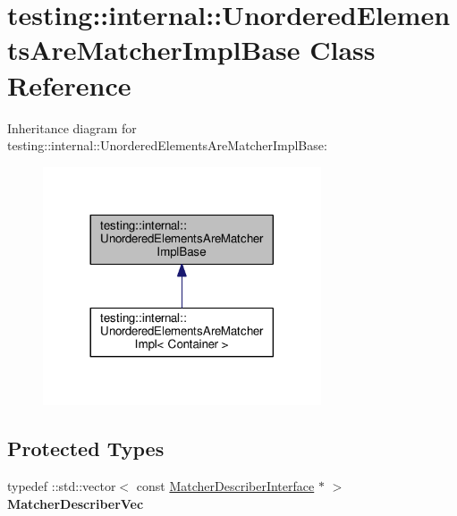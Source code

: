 \hypertarget{classtesting_1_1internal_1_1_unordered_elements_are_matcher_impl_base}{}\section{testing\+:\+:internal\+:\+:Unordered\+Elements\+Are\+Matcher\+Impl\+Base Class Reference}
\label{classtesting_1_1internal_1_1_unordered_elements_are_matcher_impl_base}


Inheritance diagram for testing\+:\+:internal\+:\+:Unordered\+Elements\+Are\+Matcher\+Impl\+Base\+:
\nopagebreak
\begin{figure}[H]
\begin{center}
\leavevmode
\includegraphics[width=233pt]{classtesting_1_1internal_1_1_unordered_elements_are_matcher_impl_base__inherit__graph}
\end{center}
\end{figure}
\subsection*{Protected Types}
\begin{DoxyCompactItemize}
\item 
\mbox{\label{classtesting_1_1internal_1_1_unordered_elements_are_matcher_impl_base_a81ca7ce793d4b25ce2a7d3e28b48cd64}} 
typedef \+::std\+::vector$<$ const \mbox{\hyperlink{classtesting_1_1_matcher_describer_interface}{Matcher\+Describer\+Interface}} $\ast$ $>$ {\bfseries Matcher\+Describer\+Vec}
\end{DoxyCompactItemize}
